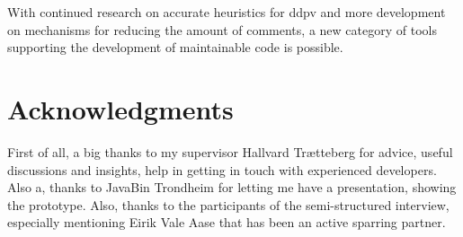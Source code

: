 \documentclass{report}
\begin{document}
With continued research on accurate heuristics for \gls{ddpv} and more development on mechanisms for reducing the amount of comments, a new category of tools supporting the development of maintainable code is possible.


\section{Acknowledgments}
\label{acknowledgements}
First of all, a big thanks to my supervisor Hallvard Trætteberg for advice, useful discussions and insights, help in getting in touch with experienced developers. Also a, thanks to JavaBin Trondheim for letting me have a presentation, showing the prototype. Also, thanks to the participants of the semi-structured interview, especially mentioning Eirik Vale Aase that has been an active sparring partner. 

\printbibliography

\appendix
\label{appendix}

\end{document}
